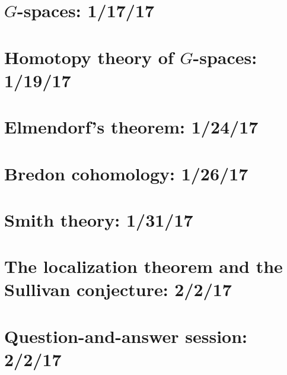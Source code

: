 \documentclass{style_EHT}
\begin{document}
\frontstuff

\section{$G$-spaces: 1/17/17}
	
\section{Homotopy theory of $G$-spaces: 1/19/17}
	
\section{Elmendorf's theorem: 1/24/17}
	
\section{Bredon cohomology: 1/26/17}
	
\section{Smith theory: 1/31/17}
	
\section{The localization theorem and the Sullivan conjecture: 2/2/17}
	
\section{Question-and-answer session: 2/2/17}
	


{}

\end{document}

